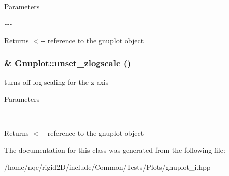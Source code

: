 \begin{DoxyParams}{Parameters}
\item[{\em -\/-\/-\/}]\end{DoxyParams}
\begin{DoxyReturn}{Returns}
$<$-\/-\/ reference to the gnuplot object 
\end{DoxyReturn}
\hypertarget{class_gnuplot_afa67f022ca344593b054d7f2e3406c7e}{
\subsubsection[{unset\_\-zlogscale}]{\& Gnuplot::unset\_\-zlogscale ()}}
\label{class_gnuplot_afa67f022ca344593b054d7f2e3406c7e}
turns off log scaling for the z axis


\begin{DoxyParams}{Parameters}
\item[{\em -\/-\/-\/}]\end{DoxyParams}
\begin{DoxyReturn}{Returns}
$<$-\/-\/ reference to the gnuplot object 
\end{DoxyReturn}


The documentation for this class was generated from the following file:\begin{DoxyCompactItemize}
\item 
/home/nqe/rigid2D/include/Common/Tests/Plots/gnuplot\_\-i.hpp\end{DoxyCompactItemize}
